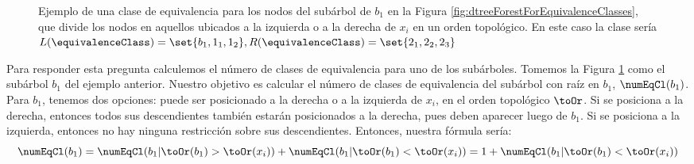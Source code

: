 
\begin{figure}[ht]
\centering 
    \caption{Ejemplo de una clase de equivalencia para los nodos del subárbol de $b_1$ en la Figura \ref{fig:dtreeForestForEquivalenceClasses}, que divide los nodos en aquellos ubicados a la izquierda o a la derecha de $x_i$ en un orden topológico. En este caso la clase sería $L(\equivalenceClass) = \set{b_1, 1_1, 1_2}, R(\equivalenceClass) = \set{2_1, 2_2, 2_3}$}
    \label{fig:unrelatedSubtree}
\end{figure}


Para responder esta pregunta calculemos el número de clases de equivalencia para uno de los subárboles. Tomemos la Figura \ref{fig:unrelatedSubtree} como el subárbol $b_1$ del ejemplo anterior. Nuestro objetivo es calcular el número de clases de equivalencia del subárbol con raíz en $b_1$, $\numEqCl(b_1)$. Para $b_1$, tenemos dos opciones: puede ser posicionado a la derecha o a la izquierda de $x_i$, en el orden topológico $\toOr$. Si se posiciona a la derecha, entonces todos sus descendientes también estarán posicionados a la derecha, pues deben aparecer luego de $b_1$. Si se posiciona a la izquierda, entonces no hay ninguna restricción sobre sus descendientes. Entonces, nuestra fórmula sería:
$$\numEqCl(b_1) = \numEqCl(b_1 | \toOr(b_1) > \toOr(x_i) ) +  \numEqCl(b_1 | \toOr(b_1) < \toOr(x_i) )  = 1 + \numEqCl(b_1 | \toOr(b_1) < \toOr(x_i) ) $$

